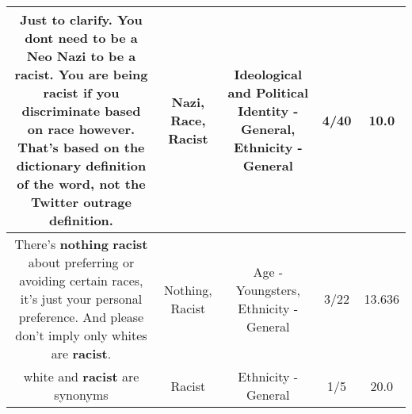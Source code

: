 \documentclass[11pt]{article}
\newlength\mylength
\begin{document}
\begin{center}
\begin{longtable}{|C{.65\mylength}|C{.30\mylength}|C{.12\mylength}|C{.12\mylength}|C{.12\mylength}|}
  \small Just to clarify. You dont need to be a Neo \textbf{Nazi} to be a \textbf{racist}. You are being \textbf{racist} if you discriminate based on \textbf{race} however. That's based on the dictionary definition of the word, not the Twitter outrage definition.\normalsize   & Nazi, Race, Racist &  Ideological and Political Identity - General, Ethnicity - General & 4/40 & 10.0 \\  \hline
  \small There's \textbf{nothing} \textbf{racist} about preferring or avoiding certain races, it's just your personal preference. And please don't imply only whites are \textbf{racist}.\normalsize   & Nothing, Racist & Age - Youngsters, Ethnicity - General & 3/22 & 13.636 \\  \hline
  \small white and \textbf{racist} are synonyms\normalsize   & Racist & Ethnicity - General & 1/5 & 20.0 \\  \hline

\end{longtable}
\end{center}
\end{document}
